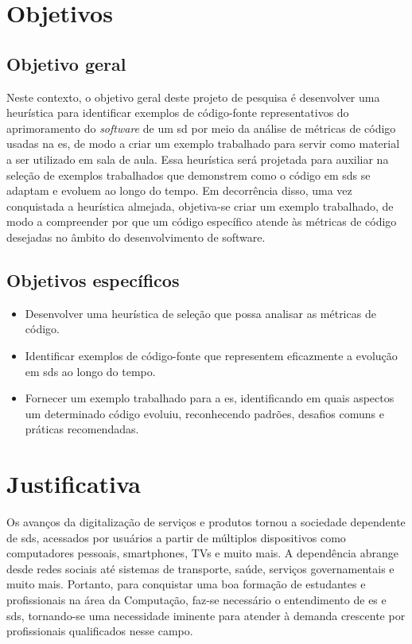 \section{Objetivos}\label{sec:objetivos}
\subsection{Objetivo geral}\label{subsec:objetivoGeral}
Neste contexto, o objetivo geral deste projeto de pesquisa é desenvolver uma heurística para identificar exemplos de código-fonte representativos do aprimoramento do \textit{software} de um \gls{sd} por meio da análise de métricas de código usadas na \gls{es}, de modo a criar um exemplo trabalhado para servir como material a ser utilizado em sala de aula. Essa heurística será projetada para auxiliar na seleção de exemplos trabalhados que demonstrem como o código em \gls{sds} se adaptam e evoluem ao longo do tempo. Em decorrência disso, uma vez conquistada a heurística almejada, objetiva-se criar um exemplo trabalhado, de modo a compreender por que um código específico atende às métricas de código desejadas no âmbito do desenvolvimento de software.

\subsection{Objetivos específicos}\label{subsec:objetivosEspecificos}
\begin{itemize}
    \item Desenvolver uma heurística de seleção que possa analisar as métricas de código.
    \item Identificar exemplos de código-fonte que representem eficazmente a evolução em \gls{sds} ao longo do tempo.
    \item Fornecer um exemplo trabalhado para a \gls{es}, identificando em quais aspectos um determinado código evoluiu, reconhecendo padrões, desafios comuns e práticas recomendadas.
\end{itemize}

\section{Justificativa}\label{sec:justificativa}
Os avanços da digitalização de serviços e produtos tornou a sociedade dependente de \gls{sds}, acessados por usuários a partir de múltiplos dispositivos como computadores pessoais, smartphones, TVs e muito mais. A dependência abrange desde redes sociais até sistemas de transporte, saúde, serviços governamentais e muito mais. Portanto, para conquistar uma boa formação de estudantes e profissionais na área da Computação, faz-se necessário o entendimento de \gls{es} e \gls{sds}, tornando-se uma necessidade iminente para atender à demanda crescente por profissionais qualificados nesse campo. 

